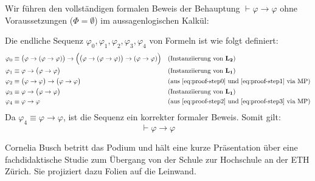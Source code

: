 \begin{math-stroke}
Wir führen den vollständigen formalen Beweis der Behauptung $\vdash \varphi \rightarrow \varphi$ ohne Voraussetzungen ($\Phi = \emptyset$) im aussagenlogischen Kalkül:

\begin{short-proof}
Die endliche Sequenz $\varphi_0, \varphi_1, \varphi_2, \varphi_3, \varphi_4$ von Formeln ist wie folgt definiert:
\begin{align}
\varphi_0 &\equiv \bigl(\varphi \rightarrow (\varphi \rightarrow \varphi)\bigr) \rightarrow \Bigl(\bigl(\varphi \rightarrow (\varphi \rightarrow \varphi)\bigr) \rightarrow (\varphi \rightarrow \varphi)\Bigr) && \text{(Instanziierung von $\mathbf{L_2}$)} \label{eq:proof-step0} \\
\varphi_1 &\equiv \varphi \rightarrow \bigl(\varphi \rightarrow \varphi\bigr) && \text{(Instanziierung von $\mathbf{L_1}$)} \label{eq:proof-step1} \\
\varphi_2 &\equiv \bigl(\varphi \rightarrow \varphi\bigr) \rightarrow \bigl(\varphi \rightarrow \varphi\bigr) && \text{(aus \ref{eq:proof-step0} und \ref{eq:proof-step1} via $\text{MP}$)} \label{eq:proof-step2} \\
\varphi_3 &\equiv \varphi \rightarrow \bigl(\varphi \rightarrow \varphi\bigr) && \text{(Instanziierung von $\mathbf{L_1}$)} \label{eq:proof-step3} \\
\varphi_4 &\equiv \varphi \rightarrow \varphi && \text{(aus \ref{eq:proof-step2} und \ref{eq:proof-step3} via $\text{MP}$)} \label{eq:proof-step4}
\end{align}
Da $\varphi_4 \equiv \varphi \rightarrow \varphi$, ist die Sequenz ein korrekter formaler Beweis. Somit gilt:
\[ \vdash \varphi \rightarrow \varphi \]
\end{short-proof}
\end{math-stroke}

\begin{meta-note}
Cornelia Busch betritt das Podium und hält eine kurze Präsentation über eine fachdidaktische Studie zum Übergang von der Schule zur Hochschule an der ETH Zürich. Sie projiziert dazu Folien auf die Leinwand.
\end{meta-note}

